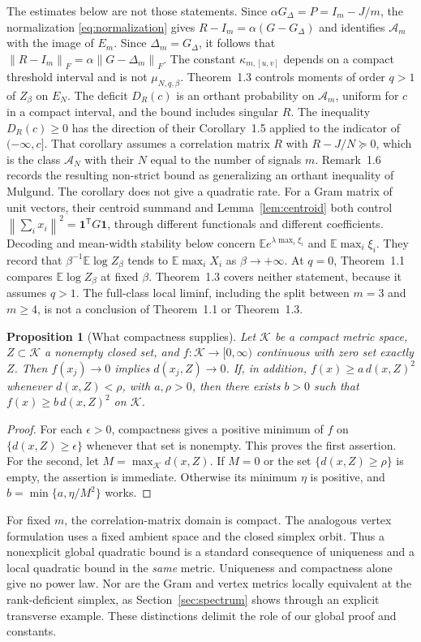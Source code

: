 \documentclass[11pt]{article}
\newtheorem{proposition}[theorem]{Proposition}
\theoremstyle{remark}\newtheorem{remark}[theorem]{Remark}
\newcommand{\E}{\mathbb E}
\newcommand{\one}{\mathbf 1}
\newcommand{\norm}[1]{\left\lVert#1\right\rVert}
\begin{document}
The estimates below are not those statements. Since
$\alpha G_\Delta=P=I_m-J/m$, the normalization \eqref{eq:normalization} gives
$R-I_m=\alpha(G-G_\Delta)$ and identifies $\mathcal A_m$ with the image of
$E_m$. Since $\Delta_m=G_\Delta$, it follows that
$\norm{R-I_m}_F=\alpha\norm{G-\Delta_m}_F$. The constant
$\kappa_{m,[u,v]}$ depends on a compact threshold interval and is not
$\mu_{N,q,\beta}$. Theorem~1.3 controls moments of order $q>1$ of $Z_\beta$
on $E_N$. The deficit $D_R(c)$ is an orthant probability on $\mathcal A_m$,
uniform for $c$ in a compact interval, and the bound includes singular $R$.
The inequality $D_R(c)\ge 0$ has the direction of their Corollary~1.5 applied
to the indicator of $(-\infty,c]$. That corollary assumes a correlation
matrix $R$ with $R-J/N\succeq 0$, which is the class $\mathcal A_N$ with
their $N$ equal to the number of signals $m$. Remark~1.6 records the
resulting non-strict bound as generalizing an orthant inequality of Mulgund.
The corollary does not give a quadratic rate. For a Gram matrix of unit
vectors, their centroid summand and Lemma~\ref{lem:centroid} both control
$\norm{\sum_i x_i}^2=\one^{\mathsf T}G\one$, through different functionals
and different coefficients. Decoding and mean-width stability below concern
$\E e^{\lambda\max_i\xi_i}$ and $\E\max_i\xi_i$. They record that
$\beta^{-1}\E\log Z_\beta$ tends to $\E\max_i X_i$ as $\beta\to+\infty$. At
$q=0$, Theorem~1.1 compares $\E\log Z_\beta$ at fixed $\beta$. Theorem~1.3
covers neither statement, because it assumes $q>1$. The full-class local
liminf, including the split between $m=3$ and $m\ge 4$, is not a conclusion
of Theorem~1.1 or Theorem~1.3.

\begin{proposition}[What compactness supplies]\label{prop:compactness}
Let $\mathcal K$ be a compact metric space, $Z\subset\mathcal K$ a nonempty
closed set, and $f:\mathcal K\to[0,\infty)$ continuous with zero set exactly
$Z$. Then $f(x_j)\to0$ implies $d(x_j,Z)\to0$. If, in addition,
$f(x)\ge a\,d(x,Z)^2$ whenever $d(x,Z)<\rho$, with $a,\rho>0$,
then there exists $b>0$ such that $f(x)\ge b\,d(x,Z)^2$ on $\mathcal K$.
\end{proposition}
\begin{proof}
For each $\epsilon>0$, compactness gives a positive minimum of $f$ on
$\{d(x,Z)\ge\epsilon\}$ whenever that set is nonempty. This proves the
first assertion. For the second, let $M=\max_{\mathcal K}d(x,Z)$.
If $M=0$ or the set $\{d(x,Z)\ge\rho\}$ is empty, the assertion is
immediate. Otherwise its minimum $\eta$ is positive, and
$b=\min\{a,\eta/M^2\}$ works.
\end{proof}
For fixed $m$, the correlation-matrix domain is compact. The analogous
vertex formulation uses a fixed ambient space and the closed simplex orbit.
Thus a nonexplicit global quadratic bound is a standard consequence of
uniqueness and a local quadratic bound in the \emph{same} metric.
Uniqueness and compactness alone give no power law. Nor are the Gram and
vertex metrics locally equivalent at the rank-deficient simplex, as
Section~\ref{sec:spectrum} shows through an explicit transverse example.
These distinctions delimit the role of our global proof and constants.
\end{document}
